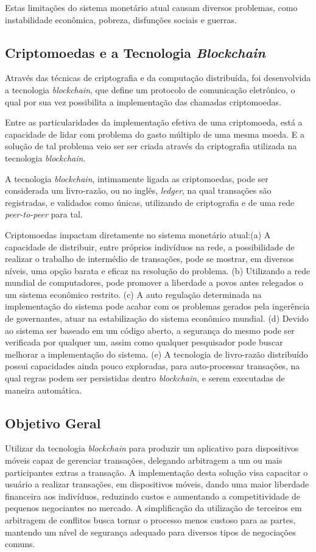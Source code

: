 \documentclass[
	article,			%
	11pt,				%
	oneside,			%
	a4paper,			%
	chapter=TITLE,		%
	section=TITLE,		%
	subsection=TITLE,	%
	subsubsection=TITLE, %
	english,			%
	brazil,				%
	sumario=tradicional
	]{ifrs-artigo-abntex2}
\begin{document}
Estas limitações do sistema monetário atual causam diversos problemas, como instabilidade econômica, pobreza, disfunções sociais e guerras.

\subsection{Criptomoedas e a Tecnologia \textit{Blockchain}}
Através das técnicas de criptografia e da computação distribuída, foi desenvolvida a tecnologia \textit{blockchain}, que define um protocolo de comunicação eletrônico, o qual por sua vez possibilita a implementação das chamadas criptomoedas.

Entre as particularidades da implementação efetiva de uma criptomoeda, está a capacidade de lidar com problema do gasto múltiplo de uma mesma moeda. E a solução de tal problema veio ser ser criada através da criptografia utilizada na tecnologia \textit{blockchain}.

A tecnologia \textit{blockchain}, intimamente ligada as criptomoedas, pode ser considerada um livro-razão, ou no inglês, \textit{ledger}, na qual transações são registradas, e validados como únicas, utilizando de criptografia e de uma rede \textit{peer-to-peer} para tal.

Criptomoedas impactam diretamente no sistema monetário atual:(a) A capacidade de distribuir, entre próprios indivíduos na rede, a possibilidade de realizar o trabalho de intermédio de transações, pode se mostrar, em diversos níveis, uma opção barata e eficaz na resolução do problema. (b) Utilizando a rede mundial de computadores, pode promover a liberdade a povos antes relegados o um sistema econômico restrito. (c) A auto regulação determinada na implementação do sistema pode acabar com os problemas gerados pela ingerência de governantes,  atuar na estabilização do sistema econômico mundial. (d) Devido ao sistema ser baseado em um código aberto, a segurança do mesmo pode ser verificada por qualquer um, assim como qualquer pesquisador pode buscar melhorar a implementação do sistema. (e) A tecnologia de livro-razão distribuído possui capacidades ainda pouco exploradas, para auto-processar transações, na qual regras podem ser persistidas dentro \textit{blockchain}, e serem executadas de maneira automática.

\subsection{Objetivo Geral}
Utilizar da tecnologia \textit{blockchain} para produzir um aplicativo para dispositivos móveis capaz de gerenciar transações, delegando arbitragem a um ou mais participantes extras a transação. A implementação desta solução visa capacitar o usuário a realizar transações, em dispositivos móveis, dando uma maior liberdade financeira aos indivíduos, reduzindo custos e aumentando a competitividade de pequenos negociantes no mercado. A simplificação da utilização de terceiros em arbitragem de conflitos busca tornar o processo menos custoso para as partes, mantendo um nível de segurança adequado para diversos tipos de negociações comuns.
\end{document}
